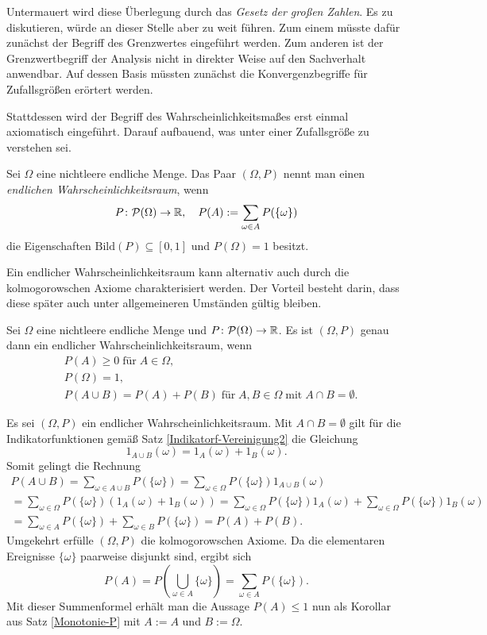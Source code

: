 Untermauert wird diese Überlegung durch das \emph{Gesetz der großen
Zahlen}. Es zu diskutieren, würde an dieser Stelle aber zu weit führen.
Zum einem müsste dafür zunächst der Begriff des Grenzwertes eingeführt werden.
Zum anderen ist der Grenzwertbegriff der Analysis nicht in direkter
Weise auf den Sachverhalt anwendbar. Auf dessen Basis müssten zunächst
die Konvergenzbegriffe für Zufallsgrößen erörtert werden.

Stattdessen wird der Begriff des Wahrscheinlichkeitsmaßes erst einmal
axiomatisch eingeführt. Darauf aufbauend, was unter einer Zufallsgröße
zu verstehen sei.

\begin{Definition}\newlinefirst
Sei $\Omega$ eine nichtleere endliche Menge. Das Paar $(\Omega,P)$ nennt
man einen \emph{endlichen Wahrscheinlichkeitsraum}, wenn
\[P\colon\mathcal P(\Omega)\to\mathbb R,\quad P(A) := \sum_{\omega\in A}P(\{\omega\})\]
die Eigenschaften $\mathrm{Bild}(P)\subseteq [0,1]$ und $P(\Omega)=1$ besitzt.
\end{Definition}

\noindent
Ein endlicher Wahrscheinlichkeitsraum kann alternativ auch durch die
kolmogorowschen Axiome charakterisiert werden. Der Vorteil besteht darin,
dass diese später auch unter allgemeineren Umständen gültig bleiben.

\begin{Satz}\label{Axiome-Kolmogorow}\newlinefirst
Sei $\Omega$ eine nichtleere endliche Menge und
$P\colon\mathcal P(\Omega)\to\mathbb R$. Es ist $(\Omega,P)$ genau dann
ein endlicher Wahrscheinlichkeitsraum, wenn
\begin{align*}
& P(A) \ge 0\;\text{für}\;A\in\Omega,\\
& P(\Omega) = 1,\\
& P(A\cup B) = P(A) + P(B)\;\text{für}\;A,B\in\Omega\;
\text{mit}\;A\cap B=\emptyset.
\end{align*}
\end{Satz}
\begin{Beweis}
Es sei $(\Omega,P)$ ein endlicher Wahrscheinlichkeitsraum.
Mit $A\cap B=\emptyset$ gilt für die Indikatorfunktionen
gemäß Satz \ref{Indikatorf-Vereinigung2} die Gleichung
\[1_{A\cup B}(\omega) = 1_A(\omega) + 1_B(\omega).\]
Somit gelingt die Rechnung
\begin{gather*}
P(A\cup B) = \sum_{\omega\in A\cup B}P(\{\omega\})
= \sum_{\omega\in\Omega}P(\{\omega\})1_{A\cup B}(\omega)\\
= \sum_{\omega\in\Omega}P(\{\omega\})(1_A(\omega)+1_B(\omega))
= \sum_{\omega\in\Omega}P(\{\omega\})1_A(\omega)+
\sum_{\omega\in\Omega}P(\{\omega\})1_B(\omega)\\
= \sum_{\omega\in A}P(\{\omega\}) + \sum_{\omega\in B}P(\{\omega\})
= P(A) + P(B).
\end{gather*}
Umgekehrt erfülle $(\Omega,P)$ die kolmogorowschen Axiome. Da die
elementaren Ereignisse $\{\omega\}$ paarweise disjunkt sind, ergibt sich
\[P(A) = P(\bigcup_{\omega\in A}\{\omega\})
= \sum_{\omega\in A} P(\{\omega\}).\]
Mit dieser Summenformel erhält man die Aussage $P(A)\le 1$ nun als Korollar
aus Satz \ref{Monotonie-P} mit $A:=A$ und $B:=\Omega$.\,\qedsymbol
\end{Beweis}

